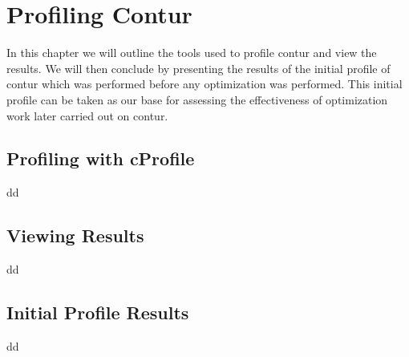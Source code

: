 \chapter{Profiling Contur}
\label{chapterlabel3}

In this chapter we will outline the tools used to profile contur and view the results. We will then conclude by presenting the results of the initial profile of contur which was performed before any optimization was performed. This initial profile can be taken as our base for assessing the effectiveness of optimization work later carried out on contur.

\section{Profiling with cProfile}
dd

\section{Viewing Results}
dd

\section{Initial Profile Results}
dd